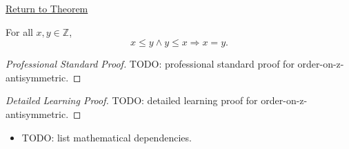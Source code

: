 \newpage
{}
\label{prf:order-on-z-antisymmetric}

\begin{remark*}[Return]
\hyperref[thm:order-on-z-antisymmetric]{Return to Theorem}
\end{remark*}

\begin{theorem*}
For all $x,y\in\mathbb{Z}$,
\[
x\le y\land y\le x \Longrightarrow x=y.
\]
\end{theorem*}

\begin{proof}[Professional Standard Proof]
\LRAProofBodyStart
TODO: professional standard proof for order-on-z-antisymmetric.
\end{proof}

\begin{proof}[Detailed Learning Proof]
\LRAProofBodyStart
TODO: detailed learning proof for order-on-z-antisymmetric.
\end{proof}

\begin{remark*}
\end{remark*}

\begin{dependencies}
\begin{itemize}
  \item TODO: list mathematical dependencies.
\end{itemize}
\end{dependencies}

\clearpage
